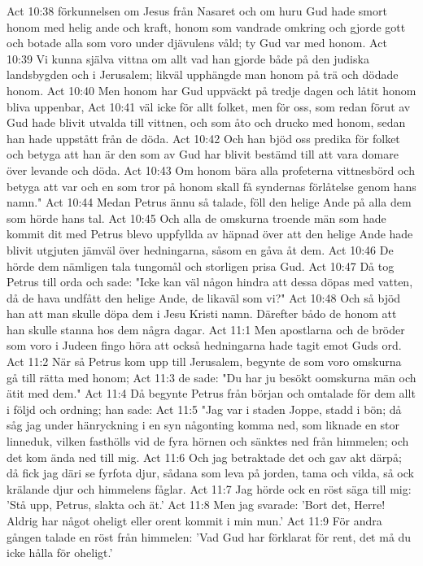 Act 10:38  förkunnelsen om Jesus från Nasaret och om huru Gud hade smort honom med helig ande och kraft, honom som vandrade omkring och gjorde gott och botade alla som voro under djävulens våld; ty Gud var med honom.
Act 10:39  Vi kunna själva vittna om allt vad han gjorde både på den judiska landsbygden och i Jerusalem; likväl upphängde man honom på trä och dödade honom.
Act 10:40  Men honom har Gud uppväckt på tredje dagen och låtit honom bliva uppenbar,
Act 10:41  väl icke för allt folket, men för oss, som redan förut av Gud hade blivit utvalda till vittnen, och som åto och drucko med honom, sedan han hade uppstått från de döda.
Act 10:42  Och han bjöd oss predika för folket och betyga att han är den som av Gud har blivit bestämd till att vara domare över levande och döda.
Act 10:43  Om honom bära alla profeterna vittnesbörd och betyga att var och en som tror på honom skall få syndernas förlåtelse genom hans namn."
Act 10:44  Medan Petrus ännu så talade, föll den helige Ande på alla dem som hörde hans tal.
Act 10:45  Och alla de omskurna troende män som hade kommit dit med Petrus blevo uppfyllda av häpnad över att den helige Ande hade blivit utgjuten jämväl över hedningarna, såsom en gåva åt dem.
Act 10:46  De hörde dem nämligen tala tungomål och storligen prisa Gud.
Act 10:47  Då tog Petrus till orda och sade: "Icke kan väl någon hindra att dessa döpas med vatten, då de hava undfått den helige Ande, de likaväl som vi?"
Act 10:48  Och så bjöd han att man skulle döpa dem i Jesu Kristi namn. Därefter bådo de honom att han skulle stanna hos dem några dagar.
Act 11:1  Men apostlarna och de bröder som voro i Judeen fingo höra att också hedningarna hade tagit emot Guds ord.
Act 11:2  När så Petrus kom upp till Jerusalem, begynte de som voro omskurna gå till rätta med honom;
Act 11:3  de sade: "Du har ju besökt oomskurna män och ätit med dem."
Act 11:4  Då begynte Petrus från början och omtalade för dem allt i följd och ordning; han sade:
Act 11:5  "Jag var i staden Joppe, stadd i bön; då såg jag under hänryckning i en syn någonting komma ned, som liknade en stor linneduk, vilken fasthölls vid de fyra hörnen och sänktes ned från himmelen; och det kom ända ned till mig.
Act 11:6  Och jag betraktade det och gav akt därpå; då fick jag däri se fyrfota djur, sådana som leva på jorden, tama och vilda, så ock krälande djur och himmelens fåglar.
Act 11:7  Jag hörde ock en röst säga till mig: 'Stå upp, Petrus, slakta och ät.'
Act 11:8  Men jag svarade: 'Bort det, Herre! Aldrig har något oheligt eller orent kommit i min mun.'
Act 11:9  För andra gången talade en röst från himmelen: 'Vad Gud har förklarat för rent, det må du icke hålla för oheligt.'
